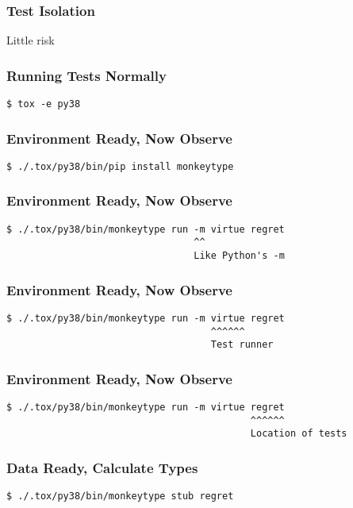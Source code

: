 \begin{frame}
\frametitle{Test Isolation}

Little risk

\end{frame}

\begin{frame}[fragile]
\frametitle{Running Tests Normally}

\begin{lstlisting}
$ tox -e py38
\end{lstlisting}
\end{frame}

\begin{frame}[fragile]
\frametitle{Environment Ready, Now Observe}
\begin{lstlisting}
$ ./.tox/py38/bin/pip install monkeytype
\end{lstlisting}
\end{frame}

\begin{frame}[fragile]
\frametitle{Environment Ready, Now Observe}
\begin{lstlisting}
$ ./.tox/py38/bin/monkeytype run -m virtue regret 
                                 ^^
                                 Like Python's -m
\end{lstlisting}
\end{frame}

\begin{frame}[fragile]
\frametitle{Environment Ready, Now Observe}
\begin{lstlisting}
$ ./.tox/py38/bin/monkeytype run -m virtue regret 
                                    ^^^^^^
                                    Test runner
\end{lstlisting}
\end{frame}

\begin{frame}[fragile]
\frametitle{Environment Ready, Now Observe}
\begin{lstlisting}
$ ./.tox/py38/bin/monkeytype run -m virtue regret 
                                           ^^^^^^
                                           Location of tests
\end{lstlisting}
\end{frame}

\begin{frame}[fragile]
\frametitle{Data Ready, Calculate Types}
\begin{lstlisting}
$ ./.tox/py38/bin/monkeytype stub regret
\end{lstlisting}
\end{frame}


